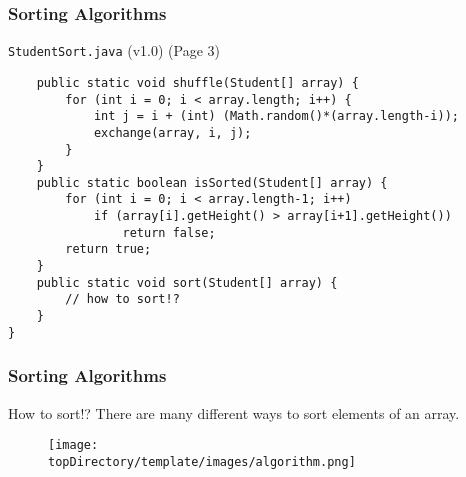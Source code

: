 \documentclass[10pt, compress]{beamer}
\begin{document}
\begin{frame}[fragile]
	\frametitle{Sorting Algorithms}
	\begin{block}{\texttt{StudentSort.java} (v1.0) (Page 3)}
		\begin{verbatim}
	public static void shuffle(Student[] array) {
		for (int i = 0; i < array.length; i++) {
			int j = i + (int) (Math.random()*(array.length-i));
			exchange(array, i, j);
		}
	}
	public static boolean isSorted(Student[] array) {
		for (int i = 0; i < array.length-1; i++)
			if (array[i].getHeight() > array[i+1].getHeight())
				return false;
		return true;
	}
	public static void sort(Student[] array) {
		// how to sort!?
	}
}
		\end{verbatim}
	\end{block}
\end{frame}

\begin{frame}[fragile]
	\frametitle{Sorting Algorithms}
	\begin{block}{How to sort!?}
	There are many different ways to sort elements of an array.
		\begin{figure}
			\texttt{[image: \\topDirectory/template/images/algorithm.png]}
		\end{figure}
	\end{block}
\end{frame}
\end{document}
